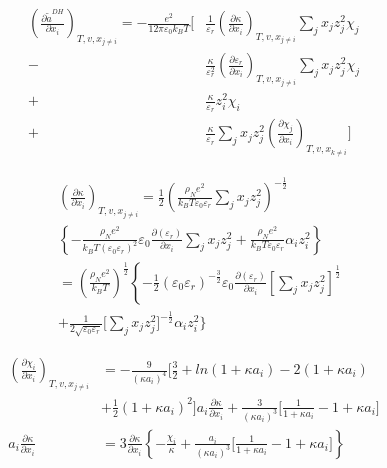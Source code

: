 \documentclass[12pt, letterpaper]{article}
\begin{document}
\begin{equation}
\begin{aligned}
\left(\frac{\partial \tilde{a}^{DH}}{\partial x_{i}}\right)_{T,v,x_{j\neq i}}
=
-\frac{e^{2}}{12\pi\varepsilon_{0}k_{B}T}
\Bigg[
&\frac{1}{\varepsilon_{r}}\left(\frac{\partial\kappa}{\partial x_{i}}\right)_{T,v,x_{j\neq i}}
\sum_{j}x_{j}z_{j}^{2}\chi_{j}
\\
-&\frac{\kappa}{\varepsilon_{r}^{2}}
\left(\frac{\partial\varepsilon_{r}}{\partial x_{i}}\right)_{T,v,x_{j\neq i}}
\sum_{j}x_{j}z_{j}^{2}\chi_{j}
\\
+&\frac{\kappa}{\varepsilon_{r}}z_{i}^{2}\chi_{i}
\\
+&\frac{\kappa}{\varepsilon_{r}}
\sum_{j}x_{j}z_{j}^{2}
\left(\frac{\partial\chi_{j}}{\partial x_{i}}\right)_{T,v,x_{k\neq i}}
\Bigg]
\end{aligned}
\end{equation}

\begin{equation}
\begin{aligned}
&\left(\frac{\partial\kappa}{\partial x_{i}}\right)_{T,v,x_{j\neq i}}=\frac12\left(\frac{\rho_{N}e^{2}}{k_{B}T\varepsilon_{0}\varepsilon_{r}}\sum_{j}x_{j}z_{j}^{2}\right)^{-\frac12}\\&\left\{-\frac{\rho_Ne^2}{k_BT\left(\varepsilon_0\varepsilon_r\right)^2}\varepsilon_0\frac{\partial\left(\varepsilon_r\right)}{\partial x_i}\sum_jx_jz_j^2+\frac{\rho_Ne^2}{k_BT\varepsilon_0\varepsilon_r}\alpha_iz_i^2\right\}\\&=\left(\frac{\rho_{N}e^{2}}{k_{B}T}\right)^{\frac{1}{2}}\left\{-\frac{1}{2}\left(\varepsilon_{0}\varepsilon_{r}\right)^{-\frac{3}{2}}\varepsilon_{0}\frac{\partial\left(\varepsilon_{r}\right)}{\partial x_{i}}\left[\sum_{j}x_{j}z_{j}^{2}\right]^{\frac{1}{2}}\right.\\&+\frac{1}{2\sqrt{\varepsilon_0\varepsilon_r}}\Bigg[\sum_jx_jz_j^2\Bigg]^{-\frac{1}{2}}\alpha_iz_i^2\Bigg\}
\end{aligned}
\end{equation}

\begin{equation}
\begin{aligned}
\left(\frac{\partial\chi_{i}}{\partial x_{i}}\right)_{T,v,x_{j\neq i}}&=-\frac{9}{\left(\kappa a_{i}\right)^{4}}\biggl[\frac{3}{2}+ln(1+\kappa a_{i})-2(1+\kappa a_{i})\\&+\frac{1}{2}\left(1+\kappa a_{i}\right)^{2}\bigg]a_{i}\frac{\partial\kappa}{\partial x_{i}}+\frac{3}{\left(\kappa a_{i}\right)^{3}}\bigg[\frac{1}{1+\kappa a_{i}}-1+\kappa a_{i}\bigg]\\a_{i}\frac{\partial\kappa}{\partial x_{i}}&= 3\frac{\partial\kappa}{\partial x_{i}}\left\{-\frac{\chi_{i}}{\kappa}+\frac{a_{i}}{\left(\kappa a_{i}\right)^{3}}\biggl[\frac{1}{1+\kappa a_{i}}-1+\kappa a_{i}\biggr]\right\}
\end{aligned}
\end{equation}
\end{document}
